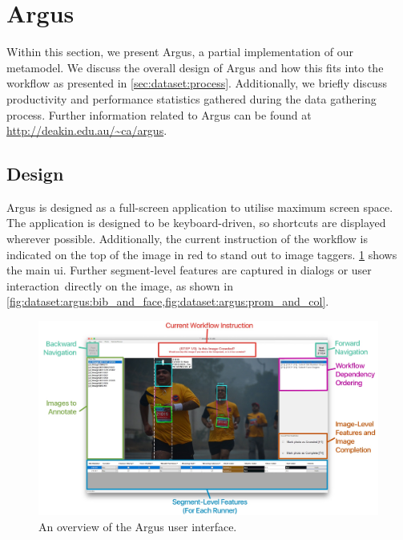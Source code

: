 \section{Argus}
\label{sec:dataset:argus}

Within this section, we present Argus, a partial implementation of our metamodel. We discuss the overall design of Argus and how this fits into the workflow as presented in \cref{sec:dataset:process}. Additionally, we briefly discuss productivity and performance statistics gathered during the data gathering process. Further information related to Argus can be found at \url{http://deakin.edu.au/~ca/argus}.

\subsection{Design}

Argus is designed as a full-screen application to utilise maximum screen space. The application is designed to be keyboard-driven, so shortcuts are displayed wherever possible. Additionally, the current instruction of the workflow is indicated on the top of the image in red to stand out to image taggers. \cref{fig:dataset:argus:overview} shows the main \gls{ui}. Further segment-level features are captured in dialogs or user interaction directly on the image, as shown in \cref{fig:dataset:argus:bib_and_face,fig:dataset:argus:prom_and_col}.

\begin{figure}[h]
  \centering
  \includegraphics[width=\textwidth]{images/dataset/argus/argus_ui}
  \caption[An overview of the Argus user interface]{An overview of the Argus user interface.}
  \label{fig:dataset:argus:overview}
\end{figure}

